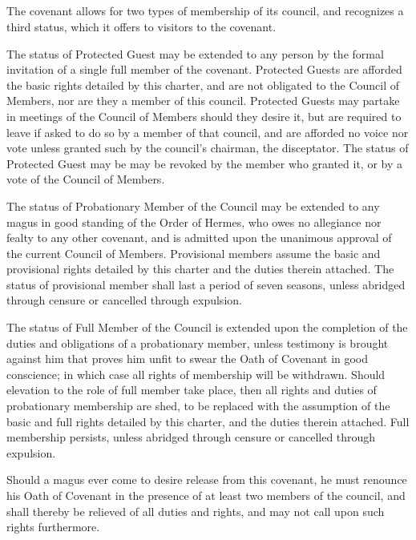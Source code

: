 \documentclass [a3paper,portrait,20pt]{article}
\begin{document}
\begin{multicols}{2}
\section*{\fontsize{35}{40}\selectfont{Membership}}
\thispagestyle{empty}
\begin{small}
	The covenant allows for two types of membership of its council, and recognizes a third status, which it
	offers to visitors to the covenant.
	
	The status of Protected Guest may be extended to any person by the formal invitation of a single full 
	member of the covenant. Protected Guests are afforded the basic rights detailed by this charter, and 
	are not obligated to the Council of Members, nor are they a member of this council. Protected Guests 
	may partake in meetings of the Council of Members should they desire it, but are required to leave if 
	asked to do so by a member of that council, and are afforded no voice nor vote unless granted such by 
	the council’s chairman, the disceptator. The status of Protected Guest may be may be revoked by the 
	member who granted it, or by a vote of the Council of Members.
	
	The status of Probationary Member of the Council may be extended to any magus in good standing of the 
	Order of Hermes, who owes no allegiance nor fealty to any other covenant, and is admitted upon the 
	unanimous approval of the current Council of Members. Provisional members assume the basic and 
	provisional rights detailed by this charter and the duties therein attached. The status of provisional 
	member shall last a period of seven seasons, unless abridged through censure or cancelled through 
	expulsion.
	
	The status of Full Member of the Council is extended upon the completion of the duties and obligations 
	of a probationary member, unless testimony is brought against him that proves him unfit to swear the 
	Oath of Covenant in good conscience; in which case all rights of membership will be withdrawn. Should 
	elevation to the role of full member take place, then all rights and duties of probationary membership 
	are shed, to be replaced with the assumption of the basic and full rights detailed by this charter, and 
	the duties therein attached. Full membership persists, unless abridged through censure or cancelled 
	through expulsion.
	
	Should a magus ever come to desire release from this covenant, he must renounce his Oath of Covenant in
	the presence of at least two members of the council, and shall thereby be relieved of all duties and 
	rights, and may not call upon such rights furthermore.
	
\end{small}
\end{multicols}
\newpage
\end{document}
